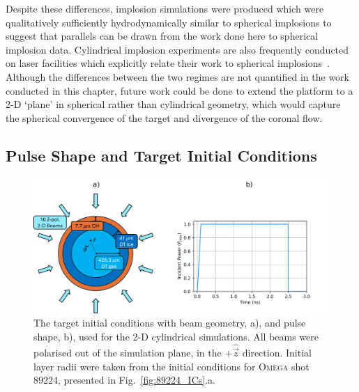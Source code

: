 Despite these differences, implosion simulations were produced which were qualitatively sufficiently hydrodynamically similar to spherical implosions to suggest that parallels can be drawn from the work done here to spherical implosion data.
Cylindrical implosion experiments are also frequently conducted on laser facilities which explicitly relate their work to spherical implosions~\cite{perez-callejo_cylindrical_2022,tubbs_direct-drive_1999}.
Although the differences between the two regimes are not quantified in the work conducted in this chapter, future work could be done to extend the platform to a 2-D `plane' in spherical rather than cylindrical geometry, which would capture the spherical convergence of the target and divergence of the coronal flow.

\subsection{Pulse Shape and Target Initial Conditions}%
\label{sec:Res1_initialconditions}

\begin{figure}[t!]
    \includegraphics[width=\linewidth]{Results1/Images/cyl_setup.png}
    \centering
    \caption{The target initial conditions with beam geometry, a), and pulse shape, b), used for the 2-D cylindrical simulations.
    All beams were polarised out of the simulation plane, in the $+\hat{\vec{z}}$ direction.
    Initial layer radii were taken from the initial conditions for \textsc{Omega} shot 89224, presented in Fig.~\ref{fig:89224_ICs}.a.}%
    \label{fig:Res1_cyl_setup}
\end{figure}

